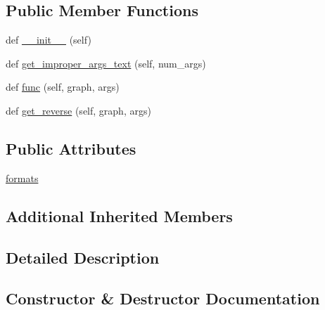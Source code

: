 \subsection*{Public Member Functions}
\begin{DoxyCompactItemize}
\item 
def \hyperlink{classlight__chats_1_1graph_1_1LockFunction_a3b0ae63ba1342ce53d664a879f040f7a}{\+\_\+\+\_\+init\+\_\+\+\_\+} (self)
\item 
def \hyperlink{classlight__chats_1_1graph_1_1LockFunction_a816faf6314525be44d40024fd83d72d8}{get\+\_\+improper\+\_\+args\+\_\+text} (self, num\+\_\+args)
\item 
def \hyperlink{classlight__chats_1_1graph_1_1LockFunction_afdb92aaa380487d44d27381bd168240a}{func} (self, graph, args)
\item 
def \hyperlink{classlight__chats_1_1graph_1_1LockFunction_a90dd7a90a271b6d2f27b17f6796daa91}{get\+\_\+reverse} (self, graph, args)
\end{DoxyCompactItemize}
\subsection*{Public Attributes}
\begin{DoxyCompactItemize}
\item 
\hyperlink{classlight__chats_1_1graph_1_1LockFunction_a5a4e9e70cf33889e84cc3d713cb3a270}{formats}
\end{DoxyCompactItemize}
\subsection*{Additional Inherited Members}


\subsection{Detailed Description}
\begin{DoxyVerb}
\end{DoxyVerb}
 

\subsection{Constructor \& Destructor Documentation}
\mbox{\label{classlight__chats_1_1graph_1_1LockFunction_a3b0ae63ba1342ce53d664a879f040f7a}} 

